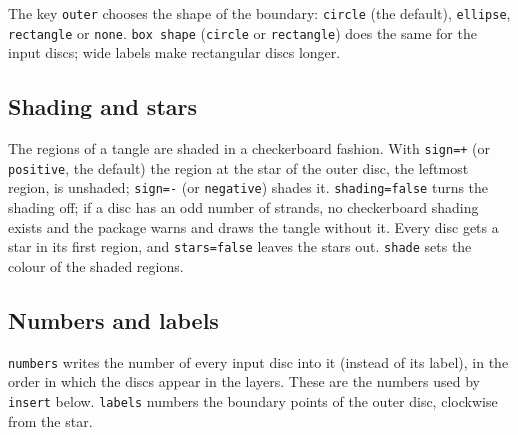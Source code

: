 \documentclass[11pt]{article}
\newenvironment{result}{\par\smallskip\noindent\hspace*{1em}}{\par\medskip}
\newcommand\opt[1]{\texttt{#1}}
\begin{document}
The key \opt{outer} chooses the shape of the boundary: \opt{circle} (the
default), \opt{ellipse}, \opt{rectangle} or \opt{none}. \opt{box shape}
(\opt{circle} or \opt{rectangle}) does the same for the input discs; wide
labels make rectangular discs longer.

\begin{code}
\end{code}
\begin{result}
  \qquad
  \qquad
  \qquad
\end{result}

\subsection{Shading and stars}

The regions of a tangle are shaded in a checkerboard fashion. With
\opt{sign=+} (or \opt{positive}, the default) the region at the star of the
outer disc, the leftmost region, is unshaded; \opt{sign=-} (or
\opt{negative}) shades it. \opt{shading=false} turns the shading off; if a
disc has an odd number of strands, no checkerboard shading exists and the
package warns and draws the tangle without it. Every disc gets a star in its
first region, and \opt{stars=false} leaves the stars out. \opt{shade} sets
the colour of the shaded regions.

\begin{code}
    
  
\end{code}
\begin{result}
  \quad {}\quad {}\quad
  \quad {}
\end{result}

\subsection{Numbers and labels}

\opt{numbers} writes the number of every input disc into it (instead of its
label), in the order in which the discs appear in the layers. These are the
numbers used by \opt{insert} below. \opt{labels} numbers the boundary points
of the outer disc, clockwise from the star.
\end{document}

